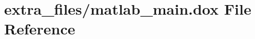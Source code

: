 \hypertarget{matlab__main_8dox}{}\section{extra\+\_\+files/matlab\+\_\+main.dox File Reference}
\label{matlab__main_8dox}
